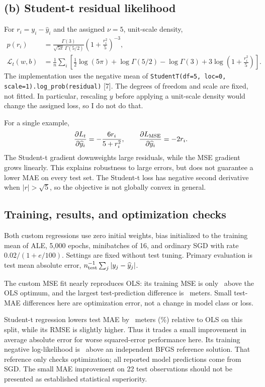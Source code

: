 \documentclass[10pt,letterpaper]{article}
\newcommand{\code}[1]{\texttt{#1}}
\begin{document}
\subsection*{(b) Student-t residual likelihood}
For $r_i=y_i-\widehat y_i$ and the assigned $\nu=5$, unit-scale density,
\begin{align*}
p(r_i)&=\frac{\Gamma(3)}{\sqrt{5\pi}\,\Gamma(5/2)}
\left(1+\frac{r_i^2}{5}\right)^{-3},\\
\mathcal L_t(w,b)&=\frac1n\sum_i\left[
\tfrac12\log(5\pi)+\log\Gamma(5/2)-\log\Gamma(3)
+3\log\left(1+\frac{r_i^2}{5}\right)\right].
\end{align*}
The implementation uses the negative mean of
\code{StudentT(df=5, loc=0, scale=1).log\_prob(residual)} [7].
The degrees of freedom and scale are fixed, not fitted. In particular, rescaling
$y$ before applying a unit-scale density would change the assigned loss, so I do
not do that.

For a single example,
\[
\frac{\partial L_t}{\partial\widehat y_i}
=-\frac{6r_i}{5+r_i^2},\qquad
\frac{\partial L_{\rm MSE}}{\partial\widehat y_i}=-2r_i.
\]
The Student-t gradient downweights large residuals, while the MSE gradient grows
linearly. This explains robustness to large errors, but does not guarantee a lower
MAE on every test set. The Student-t loss has negative second derivative when
$|r|>\sqrt5$, so the objective is not globally convex in general.

\subsection*{Training, results, and optimization checks}
Both custom regressions use zero initial weights, bias initialized to the training
mean of ALE, 5,000 epochs, minibatches of 16, and ordinary SGD with rate
$0.02/(1+e/100)$. Settings are fixed without test tuning. Primary evaluation is
test mean absolute error, $n_{\rm test}^{-1}\sum_j|y_j-\widehat y_j|$.

\begin{center}\small

\end{center}
The custom MSE fit nearly reproduces OLS: its training MSE is only
\MSEExcess\ above the OLS optimum, and the largest test-prediction difference
is \PredictionGap\ meters. Small test-MAE differences here are optimization
error, not a change in model class or loss.

Student-t regression lowers test MAE by \StudentImprovement\ meters
(\StudentPercent\%) relative to OLS on this split, while its RMSE is slightly
higher. Thus it trades a small improvement in average absolute error for worse
squared-error performance here. Its training negative log-likelihood is
\TExcess\ above an independent BFGS reference solution. That reference only
checks optimization; all reported model predictions come from SGD. The small
MAE improvement on 22 test observations should not be presented as established
statistical superiority.
\end{document}
